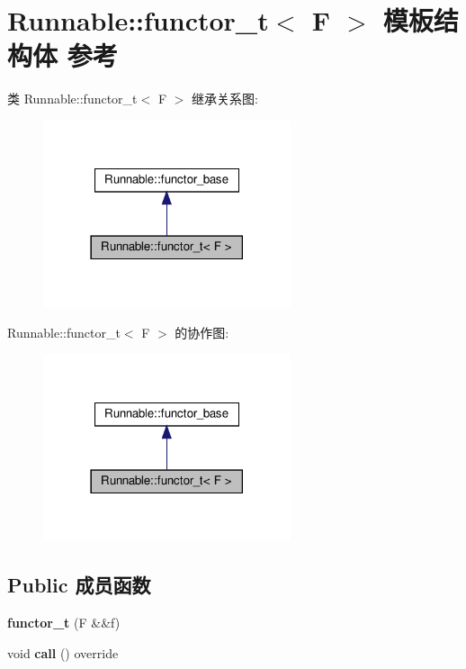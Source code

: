 \hypertarget{structRunnable_1_1functor__t}{}\section{Runnable\+:\+:functor\+\_\+t$<$ F $>$ 模板结构体 参考}
\label{structRunnable_1_1functor__t}


类 Runnable\+:\+:functor\+\_\+t$<$ F $>$ 继承关系图\+:\nopagebreak
\begin{figure}[H]
\begin{center}
\leavevmode
\includegraphics[width=206pt]{structRunnable_1_1functor__t__inherit__graph}
\end{center}
\end{figure}


Runnable\+:\+:functor\+\_\+t$<$ F $>$ 的协作图\+:\nopagebreak
\begin{figure}[H]
\begin{center}
\leavevmode
\includegraphics[width=206pt]{structRunnable_1_1functor__t__coll__graph}
\end{center}
\end{figure}
\subsection*{Public 成员函数}
\begin{DoxyCompactItemize}
\item 
\mbox{\label{structRunnable_1_1functor__t_a8125c5656f64c62ac856b0c4cbb2b1c6}} 
{\bfseries functor\+\_\+t} (F \&\&f)
\item 
\mbox{\label{structRunnable_1_1functor__t_a404feeb85c1820746441eac72f511796}} 
void {\bfseries call} () override
\end{DoxyCompactItemize}

